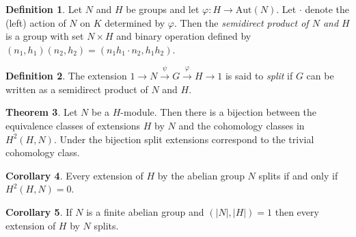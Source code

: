 \documentclass{article}
\theoremstyle{definition}
\newtheorem{theorem}{Theorem}
\newtheorem{defn}[theorem]{Definition}
\newtheorem{cor}[theorem]{Corollary}
\begin{document}
\begin{defn}
Let $N$ and $H$ be groups and let $\varphi : H \to \text{Aut}(N)$. Let $\cdot$ denote the (left) action of $N$ on $K$ determined by $\varphi$. Then the \emph{semidirect product of $N$ and $H$} is a group with set $N \times H$ and binary operation defined by $(n_1, h_1)(n_2, h_2) = (n_1 h_1 \cdot n_2, h_1 h_2)$. 
\end{defn}
\begin{defn}
The extension $1 \rightarrow N \overset{\psi}{\rightarrow} G \overset{\varphi}{\rightarrow} H \rightarrow 1$ is said to \emph{split} if $G$ can be written as a semidirect product of $N$ and $H$.
\end{defn}
\begin{theorem}
    Let $N$ be a $H$-module. Then 
    there is a bijection between the equivalence classes of extensions $H$ by $N$ and the cohomology classes in $H^2(H, N)$. Under the bijection split extensions correspond to the trivial cohomology class. 
\end{theorem}

\begin{cor}
    Every extension of $H$ by the abelian group $N$ splits if and only if $H^2(H, N) = 0$. 
\end{cor}

\begin{cor}
    If $N$ is a finite abelian group and $(|N|,|H|) = 1$ then every extension of $H$ by $N$ splits. 
\end{cor}
\end{document}
